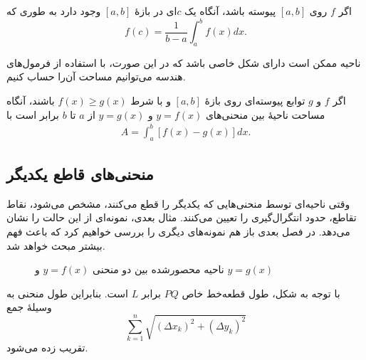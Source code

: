 \begin{theorem}\label{gmean}
اگر $f$ روی $[a,b]$ پیوسته باشد، آنگاه یک $c$ای در بازهٔ $[a,b]$
وجود دارد به طوری که
\[
f(c)=\dfrac{1}{b-a}\int _a ^b f(x) dx.
\]
\end{theorem}


ناحیه ممکن است  دارای شکل خاصی باشد که در این صورت، با استفاده از فرمول‌های  هندسه \cite{folland} می‌توانیم مساحت آن‌را حساب کنیم.

اگر $f$ و $g$ توابع پیوسته‌ای روی بازهٔ  $[a,b]$ و با شرط $f(x)\geq g(x)$ باشند،
آنگاه مساحت ناحیهٔ  بین منحنی‌های $y=f(x)$ و $y=g(x)$ از $a$ تا $b$ برابر است با
\begin{align}\label{ibet1}
A=\int_a^b [f(x)-g(x)] dx.
\end{align}
\subsection{منحنی‌های قاطع یکدیگر}
وقتی ناحیه‌ای توسط منحنی‌هایی که یکدیگر را قطع می‌کنند، مشخص می‌شود، 
نقاط تقاطع، حدود انتگرال‌گیری را تعیین می‌کنند. مثال بعدی، نمونه‌ای از این 
حالت را نشان می‌دهد. در فصل بعدی باز هم نمونه‌های دیگری را بررسی خواهیم کرد که باعث فهم
بیشتر مبحث خواهد شد.


\begin{figure}[!t]
\centering
{}
\caption{ناحیه محصورشده بین دو منحنی $y=f(x)$ و $y=g(x)$}
\label{fig1-4}
\end{figure}

با توجه به شکل، طول قطعه‌خط خاص $PQ$ برابر 
$L$
است. بنابراین طول منحنی به وسیلهٔ جمع 
\[
\sum_{k=1}^{n}\sqrt{(\Delta x_k)^2+(\Delta y_k)^2}
\]
تقریب زده می‌شود. 

